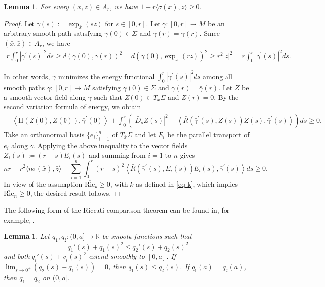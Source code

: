\documentclass[11pt, reqno]{amsart}
\newtheorem{lemma}[theorem]{Lemma}
\numberwithin{equation}{section}
\begin{document}
\begin{lemma}\label{lem 2.3''}
For every $(\bar x, \bar z) \in A_r$, we have $1-r \langle \sigma(\bar x), \bar z\rangle \ge 0$.
\end{lemma}
\begin{proof}
Let $\bar{\gamma}(s):=\exp_{\bar{x}}\left(s \bar{z}\right)$ for $s \in[0, r]$.
Let $\gamma:[0, r] \rightarrow M$ be an arbitrary smooth path satisfying $\gamma(0) \in \Sigma$ and $\gamma(r)=\bar{\gamma}(r)$. Since $(\bar{x}, \bar{z}) \in A_r$, we have
\begin{align*}
r \int_0^r\left|\gamma^{\prime}(s)\right|^2 d s \ge d(\gamma(0), \gamma(r))^2
=d\left(\gamma(0), \exp_{\bar{x}}\left(r \bar{z}\right)\right)^2
\ge r^2 |\bar{z}|^2
=r \int_0^r\left|\bar{\gamma}^{\prime}(s)\right|^2 d s.
\end{align*}

In other words, $\bar{\gamma}$ minimizes the energy functional $\int_0^r\left|\gamma^{\prime}(s)\right|^2 d s$ among all smooth paths $\gamma:[0, r] \rightarrow M$ satisfying $\gamma(0) \in \Sigma$ and $\gamma(r)=\bar{\gamma}(r)$. Let $Z$ be a smooth vector field along $\bar{\gamma}$ such that $Z(0) \in T_{\bar{x}} \Sigma$ and $Z(r)=0$.
By the second variation formula of energy, we obtain
\begin{align*}
-\left\langle \mathrm{II}(Z(0), Z(0)), \bar{\gamma}^{\prime}(0)\right\rangle +\int_0^r\left(\left|\bar{D}_s Z(s)\right|^2-\left\langle \bar{R}\left(\bar{\gamma}^{\prime}(s), Z(s)\right) Z(s), \bar{\gamma}^{\prime}(s) \right\rangle
\right) d s \ge 0.
\end{align*}
Take an orthonormal basis $\{e_i\}_{i=1}^n$ of $T_{\bar x}\Sigma$ and let $E_i$ be the parallel transport of $e_i$ along $\bar{\gamma}$. Applying the above inequality to the vector fields $Z_i(s):=(r-s) E_i(s)$ and summing from $i=1$ to $n$ gives
\begin{equation*}
nr-r^2\langle n \sigma(\bar x), \bar{z}\rangle
-\sum_{i=1}^n\int_0^r(r-s)^2\left\langle \bar{R}\left(\bar{\gamma}^{\prime}(s), E_i(s)\right) E_i(s), \bar{\gamma}^{\prime}(s) \right\rangle
d s \ge 0.
\end{equation*}
In view of the assumption $\overline{\mathrm{Ric}}_k \ge 0$, with $k$ as defined in \eqref{eq k}, which implies $\overline{\mathrm{Ric}}_n \ge 0$, the desired result follows.
\end{proof}

The following form of the Riccati comparison theorem can be found in, for example, \cite[Lemma 4.1]{BallmannRiccati}.
\begin{lemma}\label{lem riccati}
Let $q_1, q_2:(0, a] \rightarrow \mathbb{R}$ be smooth functions
such that
$$ q_1'(s)+q_1(s)^2 \le q_2'(s)+q_2(s)^2 $$
and both $q_i'(s)+q_i(s)^2$ extend smoothly to $[0, a]$.
If $\lim_{s \rightarrow 0^+} (q_2(s)-q_1(s)) =0$,
then $q_1(s) \le q_2(s)$.
If $q_1(a)=q_2(a)$, then $q_1=q_2$ on $(0, a]$.
\end{lemma}
\end{document}
